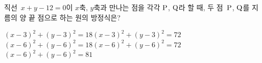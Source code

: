 직선~$x+y-12=0$이 $x$축, $y$축과 만나는 점을 각각 $\mathrm{P}$, $\mathrm{Q}$라 할 때, 두 점~$\mathrm{P}$, $\mathrm{Q}$를 지름의 양 끝 점으로 하는 원의 방정식은?
\begin{choicesv}{$(x-3)^2+(y-3)^2=18$}{$(x-3)^2+(y-3)^2=72$}{$(x-6)^2+(y-6)^2=18$}{$(x-6)^2+(y-6)^2=72$}{$(x-6)^2+(y-6)^2=81$}\end{choicesv}
